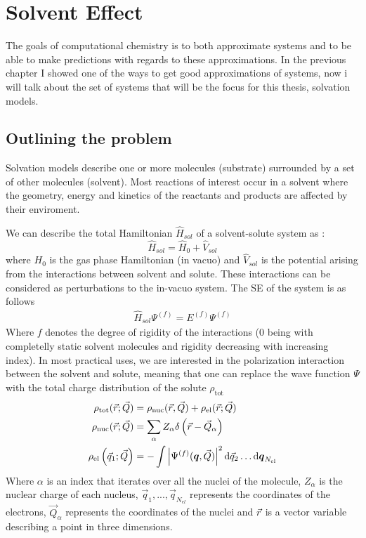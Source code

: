 \documentclass[../master_thesis.tex]{subfiles}
\begin{document}
\chapter{Solvent Effect}
The goals of computational chemistry is to both approximate systems and to be
able to make predictions with regards to these approximations. In the previous
chapter I showed one of the ways to get good approximations of systems, now i
will talk about the set of systems that will be the focus for this thesis,
solvation models.
\section{Outlining the problem}
Solvation models describe one or more molecules (substrate) surrounded by
a set of other molecules (solvent). Most reactions of interest occur in a
solvent where the geometry, energy and kinetics of the reactants and products
are affected by their enviroment\cite{Mennucci:2018}.

We can describe the total Hamiltonian $\hat{H}_{sol}$ of a solvent-solute system as
\cite{Tomasi:1994wt}:
\begin{equation}\label{eq:Hsolvent}
  \hat{H}_{sol} = \hat{H}_0 + \hat{V}_{sol}
\end{equation}
where $H_0$ is the gas phase Hamiltonian (in vacuo) and $\hat{V}_{sol}$ is the
potential arising from the interactions between solvent and solute. These
interactions can be considered as perturbations to the in-vacuo system.
The \ac{SE} of the system is as follows \cite{Tomasi:1994wt}
\begin{align}\label{eq:solSE}
  \hat{H}_{sol}\Psi^{(f)} = E^{(f)}\Psi^{(f)}
\end{align}
Where $f$ denotes the degree of  rigidity of the interactions (0 being with
completelly static solvent molecules and rigidity decreasing with increasing
index). In most practical uses, we are interested in the polarization interaction
between the solvent and solute, meaning that one can replace the wave function $\Psi$ with the
total charge distribution of the solute $\rho_{\mathrm{tot}}$
\cite{Tomasi:1994wt}
\begin{align}
  \begin{split}\mathbb{}
      \rho_{\mathrm{tot}}(\vec{r} ; \vec{Q}) &=
      \rho_{\mathrm{nuc}}(\vec{r}, \vec{Q})
      + \rho_{\mathrm{el}}(\vec{r} ; \vec{Q}) \\
      \rho_{\mathrm{nuc}}(\vec{r} ; \vec{Q}) &=
      \sum_{\alpha} Z_{\alpha} \delta\left(\vec{r}
      - \vec{Q}_{\alpha}\right) \\
      \rho_{\mathrm{el}}\left(\vec{q}_{1} ; \vec{Q}\right) &=
      -\int\left|\Psi^{(f)}(\boldsymbol{q}, \vec{Q})\right|^{2}
      \mathrm{d}\vec{q}_{2} \ldots \mathrm{d}\boldsymbol{q}_{N_{\mathrm{el}}}
  \end{split}
\end{align}
Where $\alpha$ is an index that iterates over all the nuclei of the molecule,
$Z_{\alpha}$ is the nuclear charge of each nucleus, $\vec{q}_1, ..., \vec{q}_{N_{el}}$
represents the coordinates of the electrons, $\vec{Q}_{\alpha}$ represents the
coordinates of the nuclei and $\vec{r}$ is a vector variable describing a point
in three dimensions.
\end{document}
